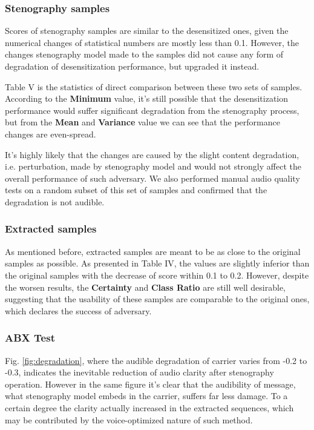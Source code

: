 \documentclass[journal]{IEEEtran} %
\begin{document}
\subsubsection{Stenography samples}

Scores of stenography samples are similar to the desensitized ones, given the numerical changes of statistical numbers are mostly less than 0.1. However, the changes stenography model made to the samples did not cause any form of degradation of desensitization performance, but upgraded it instead.

Table V is the statistics of direct comparison between these two sets of samples. According to the \textbf{Minimum} value, it's still possible that the desensitization performance would suffer significant degradation from the stenography process, but from the \textbf{Mean} and \textbf{Variance} value we can see that the performance changes are even-spread.

It's highly likely that the changes are caused by the slight content degradation, i.e. perturbation, made by stenography model and would not strongly affect the overall performance of such adversary. We also performed manual audio quality tests on a random subset of this set of samples and confirmed that the degradation is not audible.

\subsubsection{Extracted samples}

As mentioned before, extracted samples are meant to be as close to the original samples as possible. As presented in Table IV, the values are slightly inferior than the original samples with the decrease of score within 0.1 to 0.2. However, despite the worsen results, the \textbf{Certainty} and \textbf{Class Ratio} are still well desirable, suggesting that the usability of these samples are comparable to the original ones, which declares the success of adversary.

\subsubsection{ABX Test}

Fig. \ref{fig:degradation}, where the audible degradation of carrier varies from -0.2 to -0.3, indicates the inevitable reduction of audio clarity after stenography operation. However in the same figure it's clear that the audibility of message, what stenography model embeds in the carrier, suffers far less damage. To a certain degree the clarity actually increased in the extracted sequences, which may be contributed by the voice-optimized nature of such method.
\end{document}
